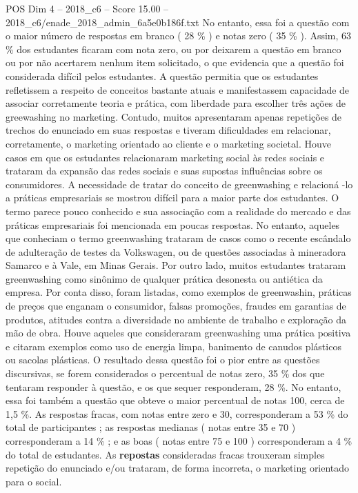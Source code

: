 \begin{textsample}{POS Dim 4 – 2018\_c6 – Score 15.00 – 2018\_c6/enade\_2018\_admin\_6a5e0b186f.txt}
No entanto, essa foi a questão com o maior número de respostas em branco ( 28 \% ) e notas zero ( 35 \% ).
Assim, 63 \% dos estudantes ficaram com nota zero, ou por deixarem a questão em branco ou por não acertarem nenhum item solicitado, o que evidencia que a questão foi considerada difícil pelos estudantes.
A questão permitia que os estudantes refletissem a respeito de conceitos bastante atuais e manifestassem capacidade de associar corretamente teoria e prática, com liberdade para escolher três ações de greewashing no marketing.
Contudo, muitos apresentaram apenas repetições de trechos do enunciado em suas respostas e tiveram dificuldades em relacionar, corretamente, o marketing orientado ao cliente e o marketing societal.
Houve casos em que os estudantes relacionaram marketing social às redes sociais e trataram da expansão das redes sociais e suas supostas influências sobre os consumidores.
A necessidade de tratar do conceito de greenwashing e relacioná -lo a práticas empresariais se mostrou difícil para a maior parte dos estudantes.
O termo parece pouco conhecido e sua associação com a realidade do mercado e das práticas empresariais foi mencionada em poucas respostas.
No entanto, aqueles que conheciam o termo greenwashing trataram de casos como o recente escândalo de adulteração de testes da Volkswagen, ou de questões associadas à mineradora Samarco e à Vale, em Minas Gerais.
Por outro lado, muitos estudantes trataram greenwashing como sinônimo de qualquer prática desonesta ou antiética da empresa.
Por conta disso, foram listadas, como exemplos de greenwashin, práticas de preços que enganam o consumidor, falsas promoções, fraudes em garantias de produtos, atitudes contra a diversidade no ambiente de trabalho e exploração da mão de obra.
Houve aqueles que consideraram greenwashing uma prática positiva e citaram exemplos como uso de energia limpa, banimento de canudos plásticos ou sacolas plásticas.
O resultado dessa questão foi o pior entre as questões discursivas, se forem considerados o percentual de notas zero, 35 \% dos que tentaram responder à questão, e os que sequer responderam, 28 \%.
No entanto, essa foi também a questão que obteve o maior percentual de notas 100, cerca de 1,5 \%.
As respostas fracas, com notas entre zero e 30, corresponderam a 53 \% do total de participantes ; as respostas medianas ( notas entre 35 e 70 ) corresponderam a 14 \% ; e as boas ( notas entre 75 e 100 ) corresponderam a 4 \% do total de estudantes.
As \textbf{repostas} consideradas fracas trouxeram simples repetição do enunciado e/ou trataram, de forma incorreta, o marketing orientado para o social.

\end{textsample}
